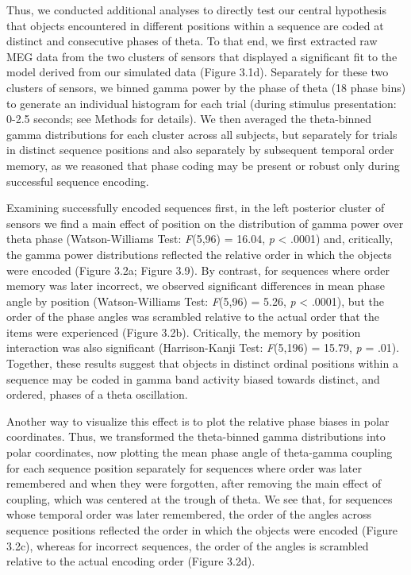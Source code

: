 Thus, we conducted additional analyses to directly test our central
hypothesis that objects encountered in different positions within a
sequence are coded at distinct and consecutive phases of theta. To that
end, we first extracted raw MEG data from the two clusters of sensors
that displayed a significant fit to the model derived from our simulated
data (Figure 3.1d). Separately for these two clusters of sensors, we
binned gamma power by the phase of theta (18 phase bins) to generate an
individual histogram for each trial (during stimulus presentation: 0-2.5
seconds; see Methods for details). We then averaged the theta-binned
gamma distributions for each cluster across all subjects, but separately
for trials in distinct sequence positions and also separately by
subsequent temporal order memory, as we reasoned that phase coding may
be present or robust only during successful sequence encoding.

Examining successfully encoded sequences first, in the left posterior
cluster of sensors we find a main effect of position on the distribution
of gamma power over theta phase (Watson-Williams Test: \emph{F}(5,96) =
16.04, \emph{p} \textless{} .0001) and, critically, the gamma power
distributions reflected the relative order in which the objects were
encoded (Figure 3.2a; Figure 3.9). By contrast, for sequences where
order memory was later incorrect, we observed significant differences in
mean phase angle by position (Watson-Williams Test: \emph{F}(5,96) =
5.26, \emph{p} \textless{} .0001), but the order of the phase angles was
scrambled relative to the actual order that the items were experienced
(Figure 3.2b). Critically, the memory by position interaction was also
significant (Harrison-Kanji Test: \emph{F}(5,196) = 15.79, \emph{p} =
.01). Together, these results suggest that objects in distinct ordinal
positions within a sequence may be coded in gamma band activity biased
towards distinct, and ordered, phases of a theta oscillation.

Another way to visualize this effect is to plot the relative phase
biases in polar coordinates. Thus, we transformed the theta-binned gamma
distributions into polar coordinates, now plotting the mean phase angle
of theta-gamma coupling for each sequence position separately for
sequences where order was later remembered and when they were forgotten,
after removing the main effect of coupling, which was centered at the
trough of theta. We see that, for sequences whose temporal order was
later remembered, the order of the angles across sequence positions
reflected the order in which the objects were encoded (Figure 3.2c),
whereas for incorrect sequences, the order of the angles is scrambled
relative to the actual encoding order (Figure 3.2d).

